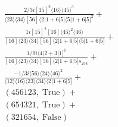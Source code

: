 \documentclass[varwidth, border=5pt]{standalone}
\begin{document}
\begin{my}
$\begin{gathered}
\scriptscriptstyle\frac{2/3i[15]^3⟨16⟩⟨45⟩^3}{⟨23⟩⟨34⟩[56]⟨2|1+6|5]⟨5|1+6|5]^2}+\\
\scriptscriptstyle\frac{1i[15]^2[16]⟨45⟩^2⟨46⟩}{[16]⟨23⟩⟨34⟩[56]⟨2|1+6|5]⟨5|1+6|5]}+\\
\scriptscriptstyle\frac{1/9i⟨4|2+3|1]^3}{[16]⟨23⟩⟨34⟩[56]⟨2|1+6|5]s_{234}}+\\
\scriptscriptstyle\frac{-1/3i⟨56⟩⟨24⟩⟨46⟩^2}{⟨12⟩⟨16⟩⟨23⟩⟨34⟩⟨2|1+6|5]}+\\
\scriptscriptstyle(456123,\;\text{True})+\\
\scriptscriptstyle(654321,\;\text{True})+\\
\scriptscriptstyle(321654,\;\text{False})\phantom{+}
\end{gathered}$
\end{my}
\end{document}
